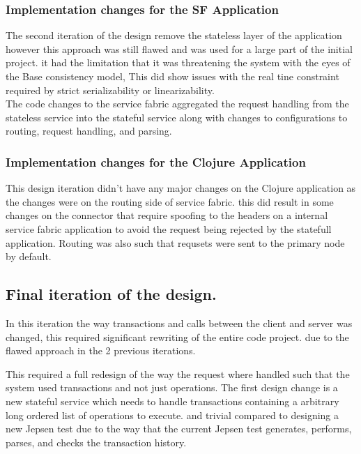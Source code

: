 \documentclass[a4paper,10pt,titlepage]{report}
\begin{document}
    \subsubsection{Implementation changes for the SF Application}
    The second iteration of the design remove the stateless layer of the application however this approach was still flawed and was used for a large part of the initial project. it had the limitation that it was threatening the system with the eyes of the Base consistency model, This did show issues with the real tine constraint required by strict serializability or linearizability. \\
    
    The code changes to the service fabric aggregated the request handling from the stateless service into the stateful service along with changes to configurations to routing, request handling, and parsing.
    
    

    \subsubsection{Implementation changes for the Clojure Application}
        This design iteration didn't have any major changes on the Clojure application as the changes were on the routing side of service fabric. this did result in some changes on the connector that require spoofing to the headers on a internal service fabric application to avoid the request being rejected by the statefull application. Routing was also such that requsets were sent to the primary node by default.
    

\subsection{Final iteration of the design.}
    In this iteration the way transactions and calls between the client and server was changed, this required significant rewriting of the entire code project. due to the flawed approach in the 2 previous iterations.
    
    This required a full redesign of the way the request where handled such that the system used transactions and not just operations. The first design change is a new stateful service which needs to handle transactions containing a arbitrary long ordered list of operations to execute. and trivial compared to designing a new Jepsen test due to the way that the current Jepsen test generates, performs, parses, and checks the transaction history. 
    
\end{document}
